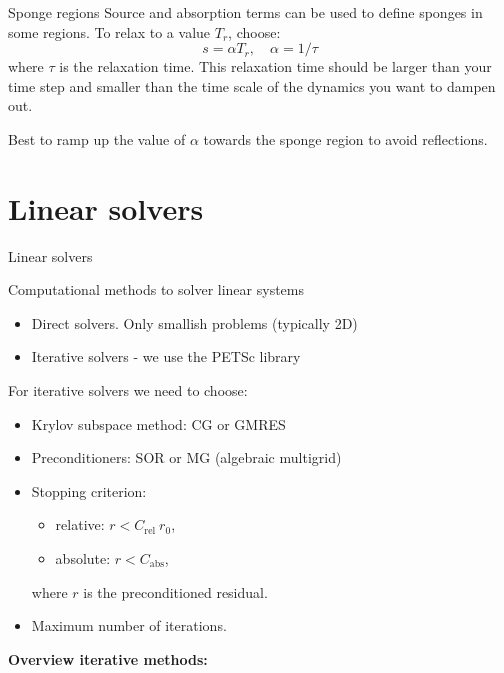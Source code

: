 \documentclass[12pt]{beamer}
\begin{document}
\begin{frame}{Sponge regions}
  Source and absorption terms can be used to define sponges in some regions. To relax to a value
  $T_r$, choose:
  \begin{equation*}
    s = \alpha T_r,\quad \alpha=1/\tau
  \end{equation*}
  where $\tau$ is the relaxation time. This relaxation time should be larger
  than your time step and smaller than the time scale of the dynamics you want
  to dampen out.
  
  Best to ramp up the value of $\alpha$ towards the sponge region
  to avoid reflections.
\end{frame}

\section{Linear solvers}
\begin{frame}{Linear solvers}
  \begin{block}{Computational methods to solver linear systems}
  \begin{itemize}
    \item Direct solvers. Only smallish problems (typically 2D)
    \item Iterative solvers - we use the PETSc library
  \end{itemize}
\end{block}

  For iterative solvers we need to choose:
  \begin{itemize}
    \item Krylov subspace method: CG or GMRES
    \item Preconditioners: SOR or MG (algebraic multigrid)
    \item Stopping criterion:
      \begin{itemize}
        \item relative:\;\; $r<C_{\text{rel}}~r_0$,
       \item absolute: $r<C_{\text{abs}}$,
      \end{itemize}
      where $r$ is the preconditioned residual.
    \item Maximum number of iterations.
  \end{itemize}

  {\small{\bf Overview iterative methods:} \citet{Saad1996}}
\end{frame}
\end{document}
